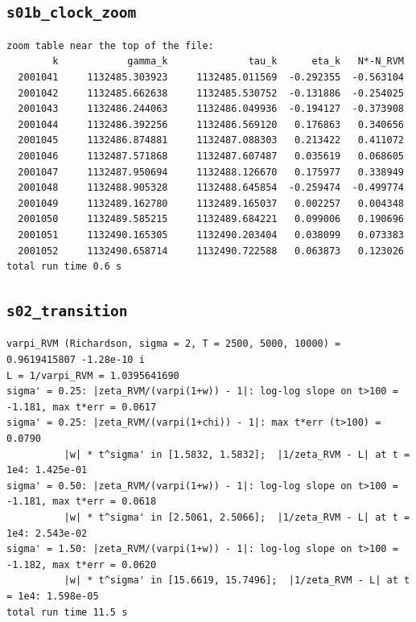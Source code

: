 \documentclass[11pt,reqno]{amsart}
\numberwithin{equation}{section}
\theoremstyle{plain}
\theoremstyle{definition}
\theoremstyle{remark}
\begin{document}
\subsection{\texttt{s01b\_clock\_zoom}}
\label{app:out-s01b-clock-zoom}

\begin{lstlisting}[style=out]
zoom table near the top of the file:
        k            gamma_k              tau_k      eta_k   N*-N_RVM
  2001041     1132485.303923     1132485.011569  -0.292355  -0.563104
  2001042     1132485.662638     1132485.530752  -0.131886  -0.254025
  2001043     1132486.244063     1132486.049936  -0.194127  -0.373908
  2001044     1132486.392256     1132486.569120   0.176863   0.340656
  2001045     1132486.874881     1132487.088303   0.213422   0.411072
  2001046     1132487.571868     1132487.607487   0.035619   0.068605
  2001047     1132487.950694     1132488.126670   0.175977   0.338949
  2001048     1132488.905328     1132488.645854  -0.259474  -0.499774
  2001049     1132489.162780     1132489.165037   0.002257   0.004348
  2001050     1132489.585215     1132489.684221   0.099006   0.190696
  2001051     1132490.165305     1132490.203404   0.038099   0.073383
  2001052     1132490.658714     1132490.722588   0.063873   0.123026
total run time 0.6 s
\end{lstlisting}

\subsection{\texttt{s02\_transition}}
\label{app:out-s02-transition}

\begin{lstlisting}[style=out]
varpi_RVM (Richardson, sigma = 2, T = 2500, 5000, 10000) = 0.9619415807 -1.28e-10 i
L = 1/varpi_RVM = 1.0395641690
sigma' = 0.25: |zeta_RVM/(varpi(1+w)) - 1|: log-log slope on t>100 = -1.181, max t*err = 0.0617
sigma' = 0.25: |zeta_RVM/(varpi(1+chi)) - 1|: max t*err (t>100) = 0.0790
          |w| * t^sigma' in [1.5832, 1.5832];  |1/zeta_RVM - L| at t = 1e4: 1.425e-01
sigma' = 0.50: |zeta_RVM/(varpi(1+w)) - 1|: log-log slope on t>100 = -1.181, max t*err = 0.0618
          |w| * t^sigma' in [2.5061, 2.5066];  |1/zeta_RVM - L| at t = 1e4: 2.543e-02
sigma' = 1.50: |zeta_RVM/(varpi(1+w)) - 1|: log-log slope on t>100 = -1.182, max t*err = 0.0620
          |w| * t^sigma' in [15.6619, 15.7496];  |1/zeta_RVM - L| at t = 1e4: 1.598e-05
total run time 11.5 s
\end{lstlisting}
\end{document}
